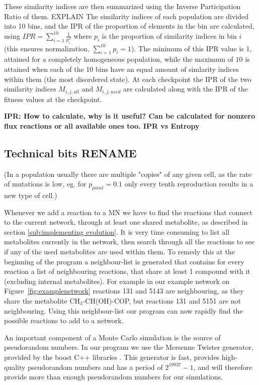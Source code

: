 \documentclass[10pt,a4paper]{article}
\begin{document}
These similarity indices are then summarized using the Inverse Participation Ratio of them. EXPLAIN  The similarity indices of each population are divided into 10 bins, and the IPR of the proportion of elements in the bin are calculated, using $IPR= \sum^{10}_{i=1} \frac{1}{p_i^2} $ where $p_i$ is the proportion of similarity indices in bin $i$ (this ensures normalization, $ \sum^{10}_{i=1} p_i=1$). The minimum of this IPR value is $1$, attained for a completely homogeneous population, while the maximum of $10$ is attained when each of the 10 bins have an equal amount of simlarity indices within them (the most disordered state).  At each checkpoint the IPR of the two similarity indices $M_{i,j,all}$ and $M_{i,j,used}$ are calculated along with the IPR of the fitness values at the checkpoint. 

\textbf{IPR: How to calculate, why is it useful? Can be calculated for nonzero flux reactions or all available ones too. IPR vs Entropy}






\subsection{Technical bits RENAME}
\label{sub:technical_bits}

(In a population usually there are multiple "copies" of any given cell, as the rate of mutations is low, eg. for $p_{point}=0.1$ only every tenth reproduction results in a new type of cell.)

	Whenever we add a reaction to a MN we have to find the reactions that connect to the current network, through at least one shared metabolite, as described in section \ref{sub:implementing evolution}. It is very time consuming to list all metabolites currently in the network, then search through all the reactions to see if any of the used metabolites are used within them. To remedy this at the beginning of the program a neighbour-list is generated that contains for every reaction a list of neighbouring reactions, that share at least 1 compound with it (excluding internal metabolites). For example in our example network on Figure~\ref{fig:examplenetwork} reactions 131 and 5143 are neighbouring, as they share the metabolite CH$_3$-CH(OH)-COP, but reactions 131 and 5151 are not neighbouring. Using this neighbour-list our program can now rapidly find the possible reactions to add to a network. 

	An important component of a Monte Carlo simulation is the source of pseudorandom numbers. In our program we use the Mersenne Twister \cite{mersennetwister} generator, provided by the boost C++ libraries \cite{boostlibraries}. This generator is fast, provides high-quality pseudorandom numbers and has a period of $2^{19937}-1$, and will therefore provide more than enough pseudorandom numbers for our simulations.
\end{document}
